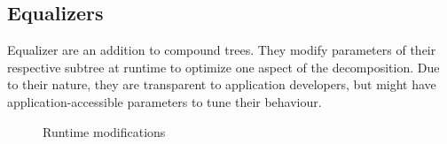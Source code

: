 \documentclass[10pt,journal,compsoc]{IEEEtran}
\begin{document}
\subsection{Equalizers}

Equalizer are an addition to compound trees. They modify parameters of their
respective subtree at runtime to optimize one aspect of the decomposition. Due
to their nature, they are transparent to application developers, but might have
application-accessible parameters to tune their behaviour.

\begin{figure}[ht]\center
  \hfil
  \hfil
  \hfil
  \hfil
  \caption{Runtime modifications}
  \label{fig:equalizers}
\end{figure}
\end{document}

